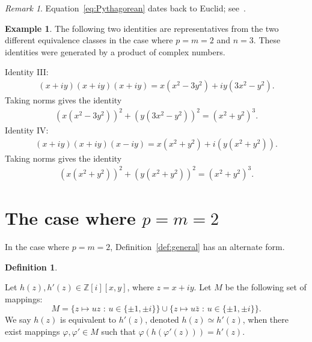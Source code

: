 \documentclass[12pt,table]{article}
\theoremstyle{definition}
\newtheorem{definition}[theorem]{Definition}
\newtheorem{example}[theorem]{Example}
\theoremstyle{remark}
\newtheorem{remark}[theorem]{Remark}
\newcommand{\Zzz}{\mathbb Z}
\numberwithin{equation}{section}
\begin{document}
\begin{remark}
Equation~\eqref{eq:Pythagorean} dates back to Euclid; see~\cite{Euclid}. 
\end{remark}

\begin{example}
The following two identities are representatives from 
the two different equivalence classes in the
case where $ p = m = 2 $ and $ n = 3$.
These identities
were generated by a product of complex numbers. 

\noindent
Identity III:
\begin{align*}
    (x + iy)(x + iy)(x + iy) 
    = x(x^2 - 3y^2) + i  y(3x^2 - y^2)  . 
    \end{align*}
Taking norms gives the identity
    \begin{align}
    (x(x^2 - 3y^2))^2 + (  y(3x^2 - y^2) )^2  
    = (x^2 + y^2)^3.
    \end{align}
Identity IV:
    \begin{align*}
    (x + iy )(x + iy)(x - iy ) 
    = x(x^2 + y^2 ) + i(y(x^2 + y^2))  .
    \end{align*}
Taking norms gives the identity
    \begin{align}
    ( x(x^2 + y^2) )^2 + ( y(x^2 + y^2) )^2 
    = (x^2 + y^2 )^3.
    \end{align}
\end{example}







\section{The case where $ p = m = 2$}


In the case where $ p = m = 2$, Definition~\ref{def:general} has an alternate form.



\begin{definition}
\label{def:2D}

Let $ h(z), h'(z) \in \Zzz [i][x,y] $,
where $ z = x + iy $.
Let $ M $ be the following set of mappings: 
\[
M = \{ z \mapsto uz \text{ : } u \in \{ \pm 1, \pm i \} \}  
\cup \{ z\mapsto u \bar{z} \text{ : } u \in \{ \pm 1, \pm i \} \}.  
\]
We say $ h(z) $ is equivalent to $ h'(z) $,
denoted $ h(z) \simeq h'(z) $,
when there exist mappings $ \varphi, \varphi' \in M $
such that $ \varphi( h( \varphi'( z ) ) )  = h'(z) $.



\end{definition}
\end{document}
